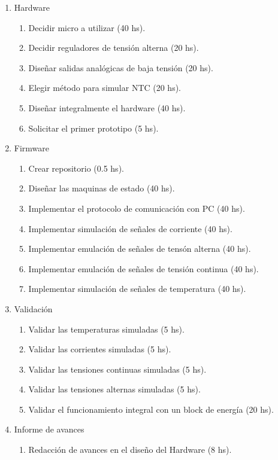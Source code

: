 \documentclass[
11pt, %
codirector, %
]{charter}
\begin{document}
\begin{enumerate}
	\item Hardware
	      \begin{enumerate}
		      \item Decidir micro a utilizar (40 hs).
		      \item Decidir reguladores de tensión alterna (20 hs).
		      \item Diseñar salidas analógicas de baja tensión (20 hs).
		      \item Elegir método para simular NTC (20 hs).
		      \item Diseñar integralmente el hardware (40 hs).
		      \item Solicitar el primer prototipo (5 hs).
	      \end{enumerate}
	\item Firmware
	      \begin{enumerate}
		      \item Crear repositorio (0.5 hs).
		      \item Diseñar las maquinas de estado (40 hs).
		      \item Implementar el protocolo de comunicación con PC (40 hs).
		      \item Implementar simulación de señales de corriente (40 hs).
		      \item Implementar emulación de señales de tensón alterna (40 hs).
		      \item Implementar emulación de señales de tensión continua (40 hs).
		      \item Implementar simulación de señales de temperatura (40 hs).
	      \end{enumerate}
	\item Validación
	      \begin{enumerate}
		      \item Validar las temperaturas simuladas (5 hs).
		      \item Validar las corrientes simuladas	(5 hs).
		      \item Validar las tensiones continuas simuladas (5 hs).
		      \item Validar las tensiones alternas simuladas (5 hs).
		      \item Validar el funcionamiento integral con un block de energía (20 hs).
	      \end{enumerate}
	\item Informe de avances
	      \begin{enumerate}
		      \item Redacción de avances en el diseño del Hardware (8 hs).

\end{enumerate}
\end{enumerate}
\end{document}
